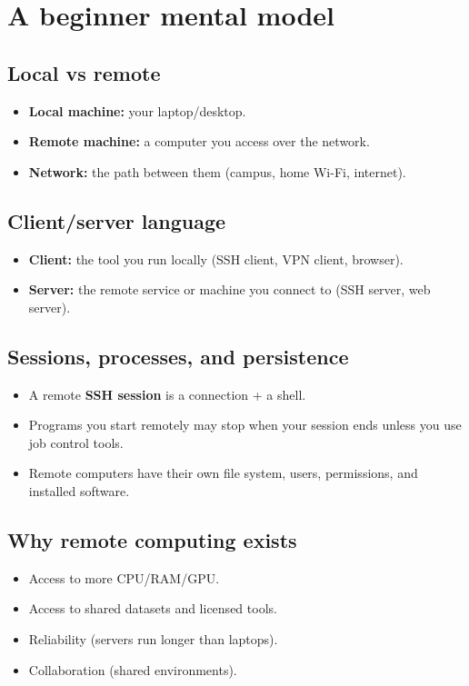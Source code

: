 \section{A beginner mental model}
\subsection{Local vs remote}
\begin{itemize}
\item \textbf{Local machine:} your laptop/desktop.
\item \textbf{Remote machine:} a computer you access over the network.
\item \textbf{Network:} the path between them (campus, home Wi-Fi, internet).
\end{itemize}

\subsection{Client/server language}
\begin{itemize}
\item \textbf{Client:} the tool you run locally (SSH client, VPN client, browser).
\item \textbf{Server:} the remote service or machine you connect to (SSH server, web server).
\end{itemize}

\subsection{Sessions, processes, and persistence}
\begin{itemize}
\item A remote \textbf{SSH session} is a connection + a shell.
\item Programs you start remotely may stop when your session ends unless you use job control tools.
\item Remote computers have their own file system, users, permissions, and installed software.
\end{itemize}

\subsection{Why remote computing exists}
\begin{itemize}
\item Access to more CPU/RAM/GPU.
\item Access to shared datasets and licensed tools.
\item Reliability (servers run longer than laptops).
\item Collaboration (shared environments).
\end{itemize}

